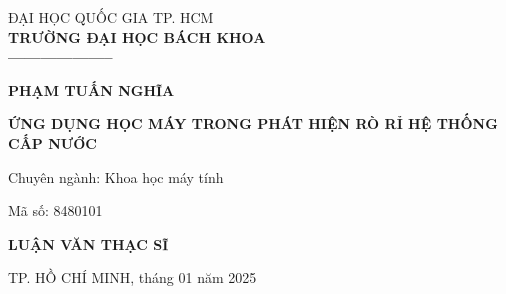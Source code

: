 \singlespacing
\begin{boxA}
\begin{titlepage}
\vspace{1em}

\begin{center}
    \fontsize{14}{20}\selectfont
    ĐẠI HỌC QUỐC GIA TP. HCM \\
    \bf TRƯỜNG ĐẠI HỌC BÁCH KHOA \\
  --------------------



\end{center}

\vspace{4em}

\begin{center}
    \fontsize{15}{20}\selectfont
    \textbf{PHẠM TUẤN NGHĨA} \\
\end{center}



\vspace{4em}
\begin{center}
    \fontsize{17}{25}\selectfont
    \textbf{ỨNG DỤNG HỌC MÁY TRONG PHÁT HIỆN RÒ RỈ HỆ THỐNG CẤP NƯỚC} \\
\end{center}
\vspace{2em}

\hspace{6em}Chuyên ngành: Khoa học máy tính

\hspace{6em}Mã số: 8480101

\vspace{4em}

\begin{center}
    \fontsize{21}{20}\selectfont
    \textbf{LUẬN VĂN THẠC SĨ} \\
\end{center}


\vspace{10em}

\begin{center}
\fontsize{12}{20}\selectfont
    TP. HỒ CHÍ MINH, tháng 01 năm 2025 \\
\end{center}
\end{titlepage}
\end{boxA}
\onehalfspacing